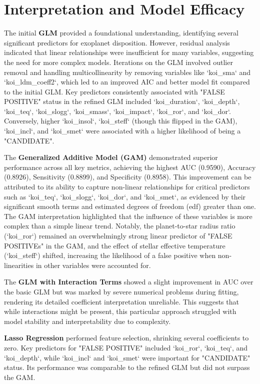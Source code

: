\section{Interpretation and Model Efficacy}
The initial \textbf{GLM} provided a foundational understanding, identifying several significant predictors for exoplanet disposition. However, residual analysis indicated that linear relationships were insufficient for many variables, suggesting the need for more complex models. Iterations on the GLM involved outlier removal and handling multicollinearity by removing variables like `koi\_sma` and `koi\_ldm\_coeff2`, which led to an improved AIC and better model fit compared to the initial GLM. Key predictors consistently associated with "FALSE POSITIVE" status in the refined GLM included `koi\_duration`, `koi\_depth`, `koi\_teq`, `koi\_slogg`, `koi\_smass`, `koi\_impact`, `koi\_ror`, and `koi\_dor`. Conversely, higher `koi\_insol`, `koi\_steff` (though this flipped in the GAM), `koi\_incl`, and `koi\_smet` were associated with a higher likelihood of being a "CANDIDATE".

The \textbf{Generalized Additive Model (GAM)} demonstrated superior performance across all key metrics, achieving the highest AUC (0.9590), Accuracy (0.8926), Sensitivity (0.8899), and Specificity (0.8958). This improvement can be attributed to its ability to capture non-linear relationships for critical predictors such as `koi\_teq`, `koi\_slogg`, `koi\_dor`, and `koi\_smet`, as evidenced by their significant smooth terms and estimated degrees of freedom (edf) greater than one. The GAM interpretation highlighted that the influence of these variables is more complex than a simple linear trend. Notably, the planet-to-star radius ratio (`koi\_ror`) remained an overwhelmingly strong linear predictor of "FALSE POSITIVEs" in the GAM, and the effect of stellar effective temperature (`koi\_steff`) shifted, increasing the likelihood of a false positive when non-linearities in other variables were accounted for.

The \textbf{GLM with Interaction Terms} showed a slight improvement in AUC over the basic GLM but was marked by severe numerical problems during fitting, rendering its detailed coefficient interpretation unreliable. This suggests that while interactions might be present, this particular approach struggled with model stability and interpretability due to complexity.

\textbf{Lasso Regression} performed feature selection, shrinking several coefficients to zero. Key predictors for "FALSE POSITIVE" included `koi\_ror`, `koi\_teq`, and `koi\_depth`, while `koi\_incl` and `koi\_smet` were important for "CANDIDATE" status. Its performance was comparable to the refined GLM but did not surpass the GAM.

